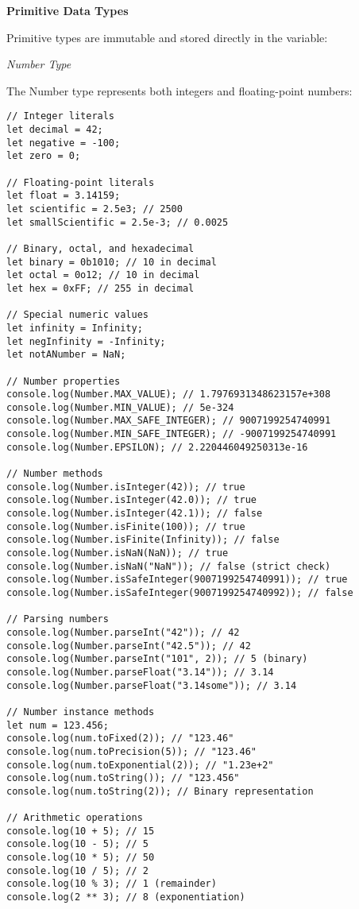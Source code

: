 \documentclass[12pt,a4paper,oneside]{book}
\newcommand{\mysubsection}[1]{%
    \vspace{0.2em}
    {\normalsize\bfseries #1}
    \vspace{0.1em}
    \addcontentsline{toc}{subsection}{#1}
}
\newcommand{\mysubsubsection}[1]{%
    \vspace{0.1em}
    {\normalsize\itshape #1}
    \vspace{0.1em}
}
\begin{document}
\mysubsection{Primitive Data Types}

Primitive types are immutable and stored directly in the variable:

\mysubsubsection{Number Type}

The Number type represents both integers and floating-point numbers:

\begin{lstlisting}[style=javascript, caption={\textbf{Number Type - Complete Examples}}, label=lst:number-type]
// Integer literals
let decimal = 42;
let negative = -100;
let zero = 0;

// Floating-point literals
let float = 3.14159;
let scientific = 2.5e3; // 2500
let smallScientific = 2.5e-3; // 0.0025

// Binary, octal, and hexadecimal
let binary = 0b1010; // 10 in decimal
let octal = 0o12; // 10 in decimal
let hex = 0xFF; // 255 in decimal

// Special numeric values
let infinity = Infinity;
let negInfinity = -Infinity;
let notANumber = NaN;

// Number properties
console.log(Number.MAX_VALUE); // 1.7976931348623157e+308
console.log(Number.MIN_VALUE); // 5e-324
console.log(Number.MAX_SAFE_INTEGER); // 9007199254740991
console.log(Number.MIN_SAFE_INTEGER); // -9007199254740991
console.log(Number.EPSILON); // 2.220446049250313e-16

// Number methods
console.log(Number.isInteger(42)); // true
console.log(Number.isInteger(42.0)); // true
console.log(Number.isInteger(42.1)); // false
console.log(Number.isFinite(100)); // true
console.log(Number.isFinite(Infinity)); // false
console.log(Number.isNaN(NaN)); // true
console.log(Number.isNaN("NaN")); // false (strict check)
console.log(Number.isSafeInteger(9007199254740991)); // true
console.log(Number.isSafeInteger(9007199254740992)); // false

// Parsing numbers
console.log(Number.parseInt("42")); // 42
console.log(Number.parseInt("42.5")); // 42
console.log(Number.parseInt("101", 2)); // 5 (binary)
console.log(Number.parseFloat("3.14")); // 3.14
console.log(Number.parseFloat("3.14some")); // 3.14

// Number instance methods
let num = 123.456;
console.log(num.toFixed(2)); // "123.46"
console.log(num.toPrecision(5)); // "123.46"
console.log(num.toExponential(2)); // "1.23e+2"
console.log(num.toString()); // "123.456"
console.log(num.toString(2)); // Binary representation

// Arithmetic operations
console.log(10 + 5); // 15
console.log(10 - 5); // 5
console.log(10 * 5); // 50
console.log(10 / 5); // 2
console.log(10 % 3); // 1 (remainder)
console.log(2 ** 3); // 8 (exponentiation)


\end{lstlisting}
\end{document}
